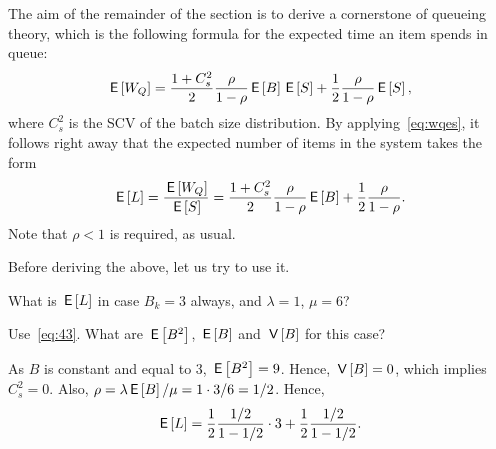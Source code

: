 \begin{comment}
\begin{exercise}\clabel{ex:l-167} 
Use the renewal reward theorem to explain that work arrives at rate $\lambda \E B$.
\begin{hint}
Observe that the total number of items is given by
\begin{equation*}
Y(t)= \sum_{k=1}^{A(t)} B_k.
\end{equation*}
What should you take for the times $\{T_k\}$? 
\end{hint}
\begin{solution}
Take $T_k = A_k$. Then $X_k = Y(A_k) - Y(A_{k-1}) = B_k$. Hence $X = \lim_{n\to\infty} n^{-1} \sum_{k=1}^n X_k = \E B$. Clearly, $Y = \lim_{t\to\infty} Y(t)/t$ is the arrival rate of work. , The relation $Y=\lambda X$ implies that the arrival rate of work is $\lambda \E B$. 
\end{solution}
\end{exercise}
\end{comment}


The aim of the remainder of the section is to derive a cornerstone of queueing theory, which is the following formula for the expected time an item spends in queue: 
\begin{equation}\label{eq:32}
\,\mathsf{E}\left[W_{Q}\right] = \frac{1+C_s^2}2 \frac{\rho}{1-\rho} \,\mathsf{E}\left[B\right] \,\mathsf{E}\left[S\right] + \frac12\frac\rho{1-\rho}\,\mathsf{E}\left[S\right],
\end{equation}
where $C_s^2$ is the SCV of the batch size distribution.
By applying~\cref{eq:wqes}, it follows right away that the expected number of items in the system takes the form
\begin{equation}\label{eq:43}
\,\mathsf{E}\left[L\right] =\frac{\,\mathsf{E}\left[W_{Q}\right]}{\,\mathsf{E}\left[S\right]} = 
\frac{1+C_s^2}2 \frac{\rho}{1-\rho} \,\mathsf{E}\left[B\right] + \frac12\frac\rho{1-\rho}.
\end{equation}
Note that $\rho< 1$ is required, as usual.

Before deriving the above, let us try to use it. 



\begin{extra}
 What is $\,\mathsf{E}\left[L\right]$ in case $B_k=3$ always, and $\lambda=1$, $\mu=6$? 
\begin{hint}
Use~\cref{eq:43}. What are $\,\mathsf{E}\left[B^2\right]$, $\,\mathsf{E}\left[B\right]$ and $\,\mathsf{V}\left[B\right]$ for this case?
\end{hint}
\begin{solution}
 As $B$ is constant and equal to 3, $\,\mathsf{E}\left[B^2\right]=9$. Hence, $\,\mathsf{V}\left[B\right]=0$, which implies
 $C_s^2=0$. Also, $\rho=\lambda\,\mathsf{E}\left[B\right]/\mu=1\cdot 3/6=1/2$. Hence,
 \begin{equation*}
 \,\mathsf{E}\left[L\right] = \frac 1 2 \frac{1/2}{1-1/2}\cdot 3 + \frac12\frac{1/2}{1-1/2}.
 \end{equation*}
\end{solution}
\end{extra}

